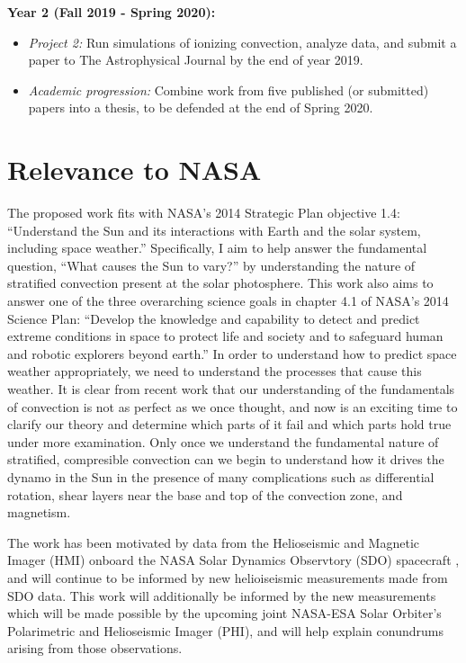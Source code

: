 \documentclass[aasms,12pt]{article}
\begin{document}
\textbf{Year 2 (Fall 2019 - Spring 2020):}
\begin{itemize}
\vspace{-0.2cm}
\item  \emph{Project 2:} Run simulations of ionizing convection, analyze data, and submit a paper to The
Astrophysical Journal by the end of year 2019.
\vspace{-0.2cm}
\item \emph{Academic progression:} Combine work from five published (or submitted) papers into a thesis, to be defended at the end of 
Spring 2020.
\end{itemize}

\section{Relevance to NASA} 
The proposed work fits with NASA's 2014 Strategic Plan objective
1.4:
``Understand the Sun and its interactions with Earth and the solar
system, including space weather.''  Specifically, I aim to help answer
the fundamental question, ``What causes the Sun to vary?'' by understanding
the nature of stratified convection present at the solar photosphere.
This work also aims to answer one of the three overarching science goals
in chapter 4.1 of NASA's 2014 Science Plan: 
``Develop the
knowledge and capability to detect and predict extreme conditions in space to
protect life and society and to safeguard human and robotic explorers beyond
earth.'' In order to understand how to predict space weather appropriately, we
need to understand the processes that cause this weather.  It is clear from
recent work that our understanding of the fundamentals of convection is not as perfect
as we once thought, and now is an exciting time to clarify our theory and determine which
parts of it fail and which parts hold true under more examination.  Only once we understand
the fundamental nature of stratified, compresible convection can we begin to understand
how it drives the dynamo in the Sun in the presence of many complications such as
differential rotation, shear layers near the base and top of the convection zone, and
magnetism.

The work has been motivated by data from the Helioseismic and Magnetic Imager (HMI) onboard
the NASA Solar Dynamics Observtory (SDO) spacecraft 
\citep{hanasoge&all2012, greer&all2015, hathaway&all2015}, and will continue to be informed by
new helioiseismic measurements made from SDO data. This work will additionally be informed
by the new measurements which will
be made possible by the upcoming joint NASA-ESA Solar Orbiter's Polarimetric and 
Helioseismic Imager (PHI), and will help explain conundrums arising from those observations.
\end{document}
